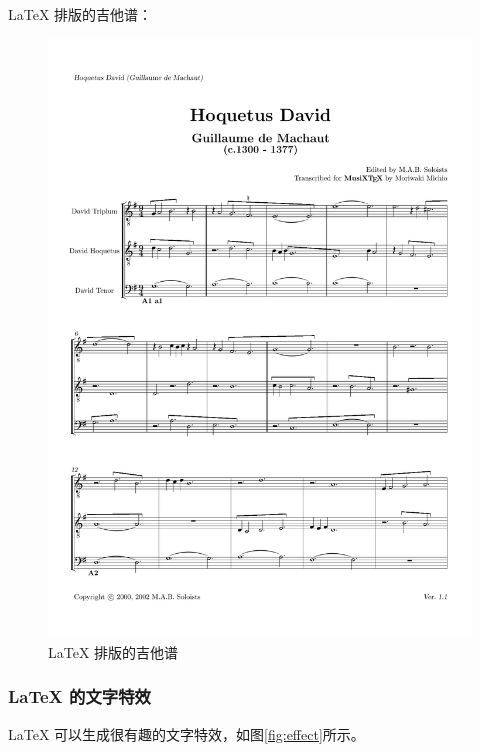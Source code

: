 \documentclass[DIV=14,fontsize=11,headinclude=false,index=totoc,footinclude=false,headings=small]{tkz-doc}
\begin{document}
\LaTeX{} 排版的吉他谱：

\begin{figure}[htbp]
  \centering
  \includegraphics[height=.72\textheight]{gm_david.pdf}
  \caption{\LaTeX{} 排版的吉他谱}
  \label{fig:guitar}
\end{figure}

\clearpage

\subsubsection{\LaTeX{} 的文字特效}
\label{sec:effect}

\LaTeX{} 可以生成很有趣的文字特效，如图\ref{fig:effect}所示。
\end{document}
